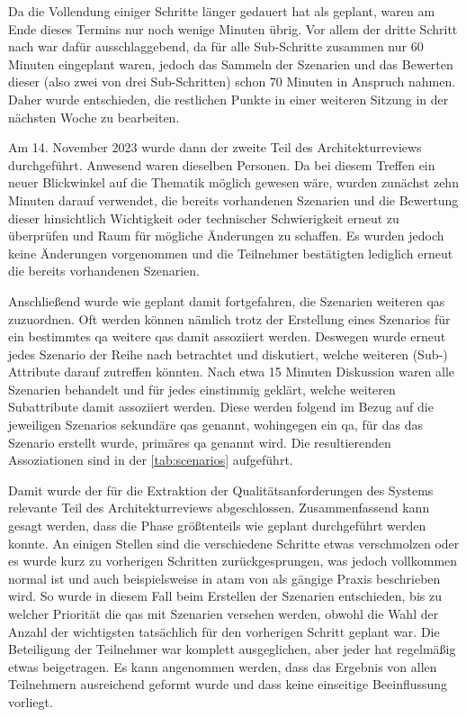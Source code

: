 Da die Vollendung einiger Schritte länger gedauert hat als geplant, waren am Ende dieses Termins nur noch wenige Minuten übrig.  
Vor allem der dritte Schritt nach  war dafür ausschlaggebend, da für alle Sub-Schritte zusammen nur 60 Minuten eingeplant waren, jedoch das Sammeln der Szenarien und das Bewerten dieser (also zwei von drei Sub-Schritten) schon 70 Minuten in Anspruch nahmen.
Daher wurde entschieden, die restlichen Punkte in einer weiteren Sitzung in der nächsten Woche zu bearbeiten.

Am 14. November 2023 wurde dann der zweite Teil des Architekturreviews durchgeführt.
Anwesend waren dieselben Personen.
Da bei diesem Treffen ein neuer Blickwinkel auf die Thematik möglich gewesen wäre, wurden zunächst zehn Minuten darauf verwendet, die bereits vorhandenen Szenarien und die Bewertung dieser hinsichtlich Wichtigkeit oder technischer Schwierigkeit erneut zu überprüfen und Raum für mögliche Änderungen zu schaffen.
Es wurden jedoch keine Änderungen vorgenommen und die Teilnehmer bestätigten lediglich erneut die bereits vorhandenen Szenarien.

Anschließend wurde wie geplant damit fortgefahren, die Szenarien weiteren \glspl{qa} zuzuordnen.
Oft werden können nämlich trotz der Erstellung eines Szenarios für ein bestimmtes \gls{qa} weitere \glspl{qa} damit assoziiert werden.
Deswegen wurde erneut jedes Szenario der Reihe nach betrachtet und diskutiert, welche weiteren (Sub-) Attribute darauf zutreffen könnten.
Nach etwa 15 Minuten Diskussion waren alle Szenarien behandelt und für jedes einstimmig geklärt, welche weiteren Subattribute damit assoziiert werden.
Diese werden folgend im Bezug auf die jeweiligen Szenarios sekundäre \glspl{qa} genannt, wohingegen ein \gls{qa}, für das das Szenario erstellt wurde, primäres \gls{qa} genannt wird.
Die resultierenden Assoziationen sind in der \cref{tab:scenarios} aufgeführt.



Damit wurde der für die Extraktion der Qualitätsanforderungen des Systems relevante Teil des Architekturreviews abgeschlossen.
Zusammenfassend kann gesagt werden, dass die Phase größtenteils wie geplant durchgeführt werden konnte.
An einigen Stellen sind die verschiedene Schritte etwas verschmolzen oder es wurde kurz zu vorherigen Schritten zurückgesprungen, was jedoch vollkommen normal ist und auch beispielsweise in \gls{atam} von  als gängige Praxis beschrieben wird.
So wurde in diesem Fall beim Erstellen der Szenarien entschieden, bis zu welcher Priorität die \glspl{qa} mit Szenarien versehen werden, obwohl die Wahl der Anzahl der wichtigsten tatsächlich für den vorherigen Schritt geplant war.
Die Beteiligung der Teilnehmer war komplett ausgeglichen, aber jeder hat regelmäßig etwas beigetragen.
Es kann angenommen werden, dass das Ergebnis von allen Teilnehmern ausreichend geformt wurde und dass keine einseitige Beeinflussung vorliegt.


